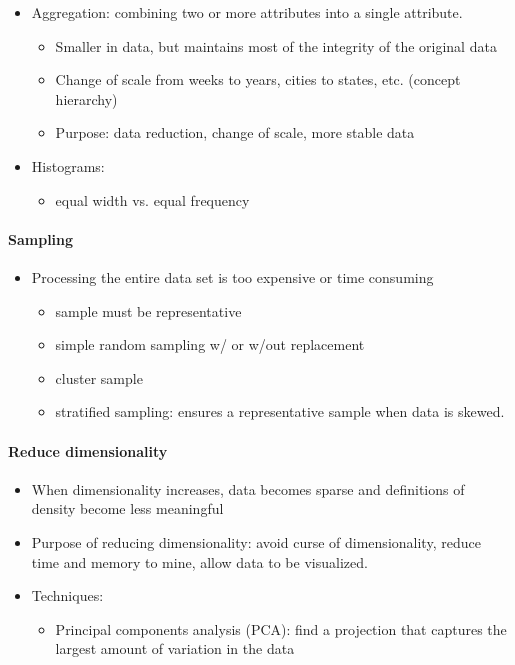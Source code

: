 \documentclass[11pt]{article}
\providecommand{\tightlist}{%
      \setlength{\itemsep}{0pt}\setlength{\parskip}{0pt}}
\begin{document}
    \begin{itemize}
\tightlist
\item
  Aggregation: combining two or more attributes into a single attribute.

  \begin{itemize}
  \tightlist
  \item
    Smaller in data, but maintains most of the integrity of the original
    data
  \item
    Change of scale from weeks to years, cities to states, etc. (concept
    hierarchy)
  \item
    Purpose: data reduction, change of scale, more stable data
  \end{itemize}
\item
  Histograms:

  \begin{itemize}
  \tightlist
  \item
    equal width vs. equal frequency
  \end{itemize}
\end{itemize}

    \paragraph{Sampling}\label{sampling}

    \begin{itemize}
\tightlist
\item
  Processing the entire data set is too expensive or time consuming

  \begin{itemize}
  \tightlist
  \item
    sample must be representative
  \item
    simple random sampling w/ or w/out replacement
  \item
    cluster sample
  \item
    stratified sampling: ensures a representative sample when data is
    skewed.
  \end{itemize}
\end{itemize}

    \paragraph{Reduce dimensionality}\label{reduce-dimensionality}

    \begin{itemize}
\tightlist
\item
  When dimensionality increases, data becomes sparse and definitions of
  density become less meaningful
\item
  Purpose of reducing dimensionality: avoid curse of dimensionality,
  reduce time and memory to mine, allow data to be visualized.
\item
  Techniques:

  \begin{itemize}
  \tightlist
  \item
    Principal components analysis (PCA): find a projection that captures
    the largest amount of variation in the data
  \end{itemize}
\end{itemize}
\end{document}
